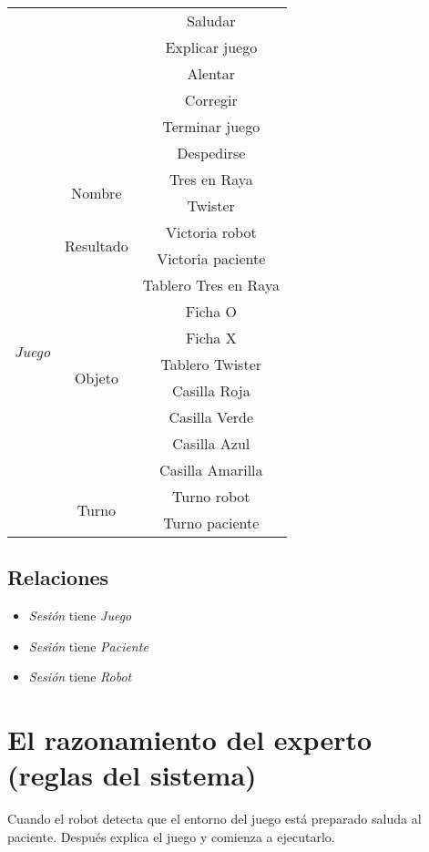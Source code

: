 \documentclass{uc3mpracticas}
\begin{document}
\begin{center}
\begin{tabular}{|c|c|c|}
    & & Saludar \\
    & & Explicar juego \\
    & & Alentar \\
    & & Corregir \\
    & & Terminar juego \\
    & & Despedirse \\
    \hline \hline
    \multirow{14}{*}{\textit{Juego}} & \multirow{2}{*}{Nombre} & Tres en Raya \\
    & & Twister \\
    \cline{2-3}
    & \multirow{2}{*}{Resultado} & Victoria robot \\
    & & Victoria paciente \\
    \cline{2-3}
    & \multirow{8}{*}{Objeto} & Tablero Tres en Raya \\
    & & Ficha O \\
    & & Ficha X \\
    & & Tablero Twister \\
    & & Casilla Roja \\
    & & Casilla Verde \\
    & & Casilla Azul \\
    & & Casilla Amarilla \\
    \cline{2-3}
    & \multirow{2}{*}{Turno} & Turno robot \\
    & & Turno paciente \\
    \hline
    \end{tabular}
  \end{center}

  \subsection{Relaciones}

  \begin{itemize}
    \item \textit{Sesión} tiene \textit{Juego}
    \item \textit{Sesión} tiene \textit{Paciente}
    \item \textit{Sesión} tiene \textit{Robot}
  \end{itemize}


  \section{El razonamiento del experto (reglas del sistema)}

  Cuando el robot detecta que el entorno del juego está preparado saluda al paciente. Después explica el juego y comienza a ejecutarlo.
\end{document}
